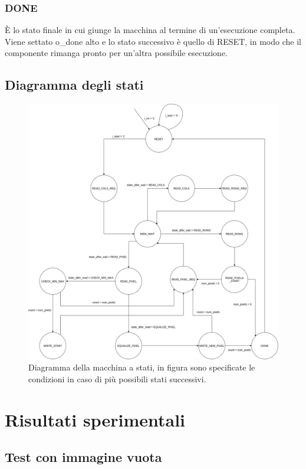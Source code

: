 \documentclass{article}
\begin{document}
\subsubsection{DONE}
È lo stato finale in cui giunge la macchina al termine di un'esecuzione completa. Viene settato o\_done alto e lo stato successivo è quello di RESET, in modo che il componente rimanga pronto per un'altra possibile esecuzione.

\subsection{Diagramma degli stati}

\begin{figure}[h]
    \includegraphics[width=\textwidth]{diagram.png}
    \centering
    \caption{Diagramma della macchina a stati, in figura sono specificate le condizioni in caso di più possibili stati successivi.}
\end{figure}


\pagebreak
\section{Risultati sperimentali}
\subsection{Test con immagine vuota}
\end{document}
